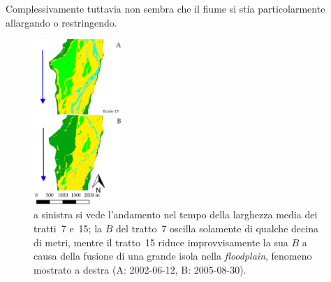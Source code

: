 Complessivamente tuttavia non sembra che il fiume si stia particolarmente allargando o restringendo.
%
\begin{figure}
	\centering
	
	\quad
	\includegraphics[width=0.3\textwidth]{files/fusione_isola_tr_15.jpeg}
	\caption[andamento temporale di $B$ per i tratti~7 e~15]{a sinistra si vede l'andamento nel tempo della larghezza media dei tratti~7 e~15; la $B$ del tratto~7 oscilla solamente di qualche decina di metri, mentre il tratto~15 riduce improvvisamente la sua $B$ a causa della fusione di una grande isola nella \emph{floodplain}, fenomeno mostrato a destra (A: 2002-06-12, B: 2005-08-30).}
	\label{fig:b-media-7-e-15}
\end{figure}
%

